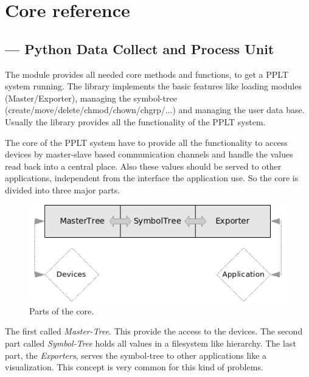 \chapter{Core reference}
\section{ --- 
        \textbf{Py}thon \textbf{D}ata \textbf{C}ollect and \textbf{P}rocess \textbf{U}nit}





The  module provides all needed core methods and functions, to
get a PPLT system running. The library implements the basic features like 
loading modules (Master/Exporter), managing the symbol-tree 
(create/move/delete/chmod/chown/chgrp/...) and managing the user
data base. Usually the  library provides all the functionality
of the PPLT system. 

The core of the PPLT system have to provide all the functionality to access devices
by master-slave based communication channels and handle the values read back into
a central place. Also these values should be served to other applications, independent
from the interface the application use. So the core is divided into three major parts.

\begin{figure}[ht]
    \centering
    \label{cDCPU}
    \includegraphics[scale=1]{cDCPU.png}
    \caption{Parts of the core.}
\end{figure}

The first called \textit{Master-Tree}. This provide the access to the devices. The 
second part called \textit{Symbol-Tree} holds all values in a filesystem like 
hierarchy. The last part, the \textit{Exporters}, serves the symbol-tree to other
applications like a visualization. This concept is very common for this kind of 
problems. 

